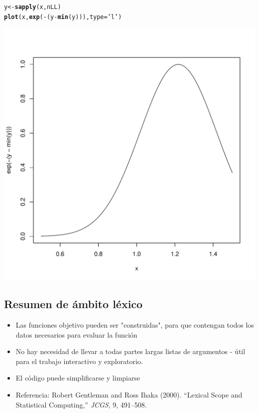 \documentclass{article}\usepackage[]{graphicx}\usepackage[]{color}
\makeatletter
\def\maxwidth{ %
  \ifdim\Gin@nat@width>\linewidth
    \linewidth
  \else
    \Gin@nat@width
  \fi
}
\newcommand{\hlstr}[1]{\textcolor[rgb]{0.192,0.494,0.8}{#1}}%
\newcommand{\hlopt}[1]{\textcolor[rgb]{0,0,0}{#1}}%
\newcommand{\hlstd}[1]{\textcolor[rgb]{0.345,0.345,0.345}{#1}}%
\newcommand{\hlkwb}[1]{\textcolor[rgb]{0.69,0.353,0.396}{#1}}%
\newcommand{\hlkwc}[1]{\textcolor[rgb]{0.333,0.667,0.333}{#1}}%
\newcommand{\hlkwd}[1]{\textcolor[rgb]{0.737,0.353,0.396}{\textbf{#1}}}%
\newenvironment{kframe}{%
 \def\at@end@of@kframe{}%
 \ifinner\ifhmode%
  \def\at@end@of@kframe{\end{minipage}}%
  \begin{minipage}{\columnwidth}%
 \fi\fi%
 \def\FrameCommand##1{\hskip\@totalleftmargin \hskip-\fboxsep
 \colorbox{shadecolor}{##1}\hskip-\fboxsep
     \hskip-\linewidth \hskip-\@totalleftmargin \hskip\columnwidth}%
 \MakeFramed {\advance\hsize-\width
   \@totalleftmargin\z@ \linewidth\hsize
   \@setminipage}}%
 {\par\unskip\endMakeFramed%
 \at@end@of@kframe}
\newenvironment{knitrout}{}{} %
\makeatother
\begin{document}
\begin{knitrout}
\begin{kframe}
\begin{alltt}
\hlstd{y} \hlkwb{<-} \hlkwd{sapply}\hlstd{(x, nLL)}
\hlkwd{plot}\hlstd{(x,} \hlkwd{exp}\hlstd{(}\hlopt{-}\hlstd{(y} \hlopt{-} \hlkwd{min}\hlstd{(y))),} \hlkwc{type} \hlstd{=} \hlstr{'l'}\hlstd{)}
\end{alltt}
\end{kframe}
\includegraphics[width=\maxwidth]{figure/unnamed-chunk-93-2} 

\end{knitrout}
    
  \subsection{Resumen de ámbito léxico}
  \begin{itemize}
    \item Las funciones objetivo pueden ser "construidas", para que contengan todos los datos necesarios para evaluar la función
    \item No hay necesidad de llevar a todas partes largas listas de argumentos - útil para el trabajo interactivo y exploratorio.
    \item El código puede simplificarse y limpiarse
    \item Referencia: Robert Gentleman and Ross Ihaka (2000). “Lexical Scope and Statistical Computing,” \emph{JCGS}, 9, 491–508.
  \end{itemize}
\end{document}
